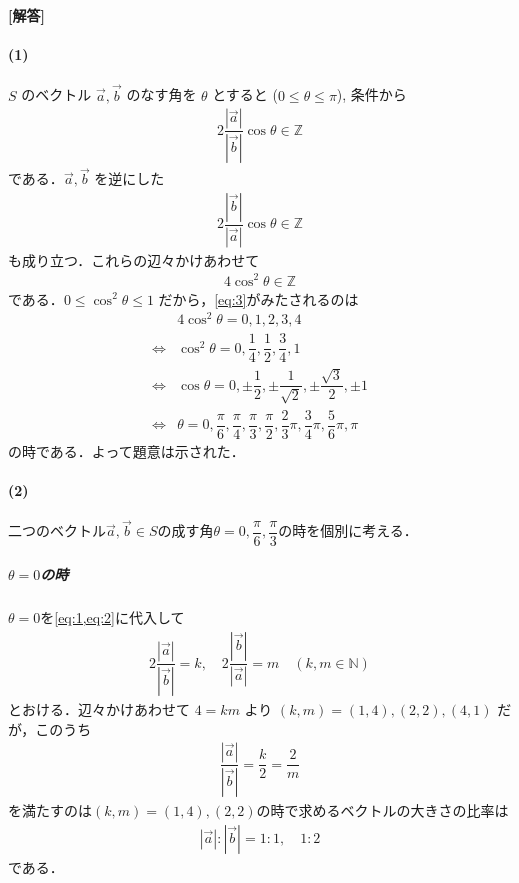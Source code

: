 \documentclass[../../main.tex]{subfiles}
\begin{document}
\begin{oframed}
  
\end{oframed}

{\bf [解答]}
\paragraph{(1)}

$S$ のベクトル $\vec{a}, \vec{b}$ のなす角を $\theta$ とすると ($0 \le \theta \le \pi$),
条件から
\begin{align}
  2 \dfrac{|\vec{a}|}{|\vec{b}|} \cos\theta \in \mathbb{Z} \label{eq:1}
\end{align}
である．$\vec{a}, \vec{b}$ を逆にした
\begin{align}
  2 \dfrac{|\vec{b}|}{|\vec{a}|} \cos\theta \in \mathbb{Z} \label{eq:2}
\end{align}
も成り立つ．これらの辺々かけあわせて
\begin{align}
  4 \cos^2\theta \in \mathbb{Z} \label{eq:3}
\end{align}
である．$0 \le \cos^2\theta \le 1$ だから，\cref{eq:3}がみたされるのは
\begin{align}
  & 4 \cos^2\theta = 0, 1, 2, 3, 4 \\
  \iff
  & \cos^2\theta = 0, \dfrac{1}{4}, \dfrac{1}{2}, \dfrac{3}{4}, 1 \\
  \iff
  & \cos\theta = 0, \pm \dfrac{1}{2}, \pm \dfrac{1}{\sqrt{2}}, \pm \dfrac{\sqrt{3}}{2}, \pm 1 \\
  \iff
  & \theta = 0, \dfrac{\pi}{6}, \dfrac{\pi}{4}, \dfrac{\pi}{3}, \dfrac{\pi}{2}, \dfrac{2}{3}\pi, \dfrac{3}{4}\pi, \dfrac{5}{6}\pi, \pi
\end{align}
の時である．よって題意は示された．

\paragraph{(2)}

二つのベクトル$\vec{a}, \vec{b} \in S$の成す角$\theta=0,\dfrac{\pi}{6},\dfrac{\pi}{3}$の時を個別に考える．

\subparagraph{$\theta=0$の時}

$\theta=0$を\cref{eq:1,eq:2}に代入して
\begin{align}
  2 \dfrac{|\vec{a}|}{|\vec{b}|} = k, \quad 2 \dfrac{|\vec{b}|}{|\vec{a}|} = m \quad (k, m \in \mathbb{N})
\end{align}
とおける．辺々かけあわせて $4 = km$ より $(k, m) = (1, 4), (2, 2), (4, 1)$ だが，このうち
\begin{align}
  \dfrac{|\vec{a}|}{|\vec{b}|} = \dfrac{k}{2} = \dfrac{2}{m}
\end{align}
を満たすのは$(k,m)=(1,4), (2,2)$の時で求めるベクトルの大きさの比率は
\begin{align}
  |\vec{a}| : |\vec{b}| = 1 : 1, \quad 1 : 2
\end{align}
である．
\end{document}
